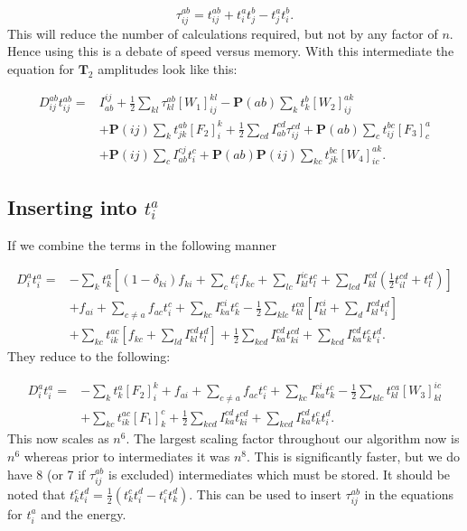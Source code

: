 \documentclass[a4paper,norsk,11pt,twoside]{report}
\begin{document}
\begin{equation}
\tau_{ij}^{ab} = t_{ij}^{ab} + t_i^a t_j^b - t_j^a t_i^b . \label{intermedtau}
\end{equation}
This will reduce the number of calculations required, but not by any factor of $n$. Hence using this is a debate of speed versus memory. With this intermediate the equation for $\textbf{T}_2$ amplitudes look like this:

\begin{align}
D_{ij}^{ab} t_{ij}^{ab} = & 
I_{ab}^{ij} +
\frac{1}{2} \sum_{kl} \tau_{kl}^{ab} [W_1]_{ij}^{kl}
- \textbf{P}(ab) \sum_k t_k^b [W_2]_{ij}^{ak}
\nonumber \\ &
+ \textbf{P}(ij) \sum_k t_{jk}^{ab} [F_2]_i^k
+ \frac{1}{2} \sum_{cd} I_{ab}^{cd} \tau_{ij}^{cd}
+ \textbf{P}(ab) \sum_c t_{ij}^{bc} [F_3]_c^a
\nonumber \\ &
+ \textbf{P}(ij) \sum_c I_{ab}^{cj} t_i^c
+ \textbf{P}(ab) \textbf{P}(ij) \sum_{kc} t_{jk}^{bc} [W_4]_{ic}^{ak} . \label{LINK_THIS_SHIT_1_T2}
\end{align}

\subsection{Inserting into $t_i^a$}

If we combine the terms in the following manner

\begin{align}
D_i^a t_i^a = &
- \sum_{k} t_k^a
\left[
(1 - \delta_{ki}) f_{ki}
+ \sum_c t_i^c
f_{kc}
+ \sum_{lc} I_{kl}^{ic} t_l^c
+ \sum_{lcd} I_{kl}^{cd} (\frac{1}{2} t_{il}^{cd} + t_l^d)
\right]
\nonumber \\ &
+ f_{ai} 
+ \sum_{c \not= a} f_{ac} t_i^c
+ \sum_{kc} I_{ka}^{ci} t_k^c 
- \frac{1}{2} \sum_{klc} t_{kl}^{ca}
\left[
I_{kl}^{ci} + \sum_d I_{kl}^{cd} t_i^d
\right]
\nonumber \\ &
+ \sum_{kc} t_{ik}^{ac} 
\left[
f_{kc} + \sum_{ld} I_{kl}^{cd} t_l^d
\right]
+ \frac{1}{2} \sum_{kcd} I_{ka}^{cd} t_{ki}^{cd} 
+ \sum_{kcd} I_{ka}^{cd} t_k^c t_i^d 
 .
\end{align}
They reduce to the following:

\begin{align}
D_i^a t_i^a = &
- \sum_{k} t_k^a
[F_2]_i^k
+ f_{ai} 
+ \sum_{c \not= a} f_{ac} t_i^c
+ \sum_{kc} I_{ka}^{ci} t_k^c 
- \frac{1}{2} \sum_{klc} t_{kl}^{ca} [W_3]_{kl}^{ic}
\nonumber \\ &
+ \sum_{kc} t_{ik}^{ac} [F_1]_k^c
+ \frac{1}{2} \sum_{kcd} I_{ka}^{cd} t_{ki}^{cd} 
+ \sum_{kcd} I_{ka}^{cd} t_k^c t_i^d 
 .
\end{align}
This now scales as $n^6$. The largest scaling factor throughout our algorithm now is $n^6$ whereas prior to intermediates it was $n^8$. This is significantly faster, but we do have 8 (or 7 if $\tau_{ij}^{ab}$ is excluded) intermediates which must be stored. It should be noted that $t_k^c t_i^d = \frac{1}{2} (t_k^c t_i^d - t_i^c t_k^d)$. This can be used to insert $\tau_{ij}^{ab}$ in the equations for $t_i^a$ and the energy. 
\end{document}
